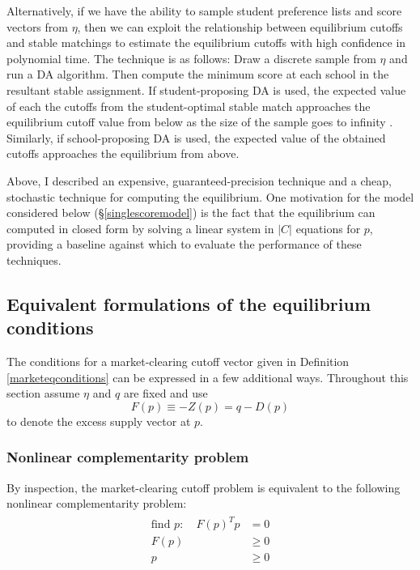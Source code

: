 \documentclass[12pt]{article}
\theoremstyle{definition}
\begin{document}
Alternatively, if we have the ability to sample student preference lists and score vectors from $\eta$, then we can exploit the relationship between equilibrium cutoffs and stable matchings to estimate the equilibrium cutoffs with high confidence in polynomial time. The technique is as follows: Draw a discrete sample from $\eta$ and run a DA algorithm. Then compute the minimum score at each school in the resultant stable assignment. If student-proposing DA is used, the expected value of each the cutoffs from the student-optimal stable match approaches the equilibrium cutoff value from below as the size of the sample goes to infinity \parencite[][]{supplydemandfw}. Similarly, if school-proposing DA is used, the expected value of the obtained cutoffs approaches the equilibrium from above. 

Above, I described an expensive, guaranteed-precision technique and a cheap, stochastic technique for computing the equilibrium. One motivation for the model considered below (\S\ref{singlescoremodel}) is the fact that the equilibrium can computed in closed form by solving a linear system in $|C|$ equations for $p$, providing a baseline against which to evaluate the performance of these techniques. 

\subsection{Equivalent formulations of the equilibrium conditions}
The conditions for a market-clearing cutoff vector given in Definition \ref{marketeqconditions} can be expressed in a few additional ways. Throughout this section assume $\eta$ and $q$ are fixed and use \[F(p) \equiv -Z(p) = q - D(p)\]
to denote the excess supply vector at $p$. 

\subsubsection{Nonlinear complementarity problem}
By inspection, the market-clearing cutoff problem is equivalent to the following nonlinear complementarity problem:
\begin{gather} \label{nonlinearcompprob}
\begin{aligned}
\text{find } p:\quad F(p)^T p & = 0 \\ F(p) &\geq 0 \\ p & \geq 0
\end{aligned}
\end{gather}
\end{document}
